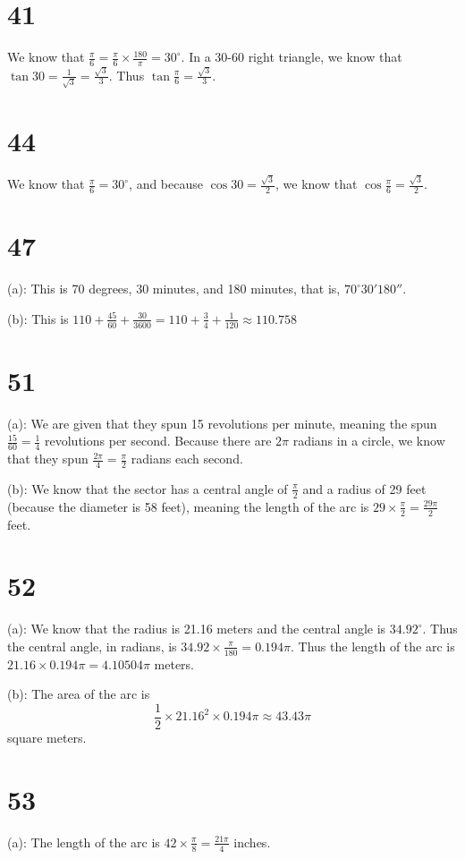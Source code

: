 \documentclass{article}
\theoremstyle{definition}
\newcommand{\?}{\stackrel{?}{=}}
\begin{document}
\section*{41}
We know that $\frac{\pi}{6}=\frac{\pi}{6}\times\frac{180}{\pi}=30^\circ$. In a 30-60 right triangle, we know that
$\tan 30=\frac{1}{\sqrt{3}}=\frac{\sqrt{3}}{3}$. Thus $\tan\frac{\pi}{6}=\frac{\sqrt{3}}{3}$.

\section*{44}
We know that $\frac{\pi}{6}=30^\circ$, and because 
$\cos 30=\frac{\sqrt{3}}{2}$, we know that $\cos\frac{\pi}{6}=\frac{\sqrt{3}}{2}$.

\section*{47}
(a): This is 70 degrees, 30 minutes, and 180 minutes, that is, $70^\circ 30'180''$.


(b): This is $110+\frac{45}{60}+\frac{30}{3600}=110+\frac{3}{4}+\frac{1}{120}\approx 110.758$

\section*{51}
(a): We are given that they spun 15 revolutions per minute, meaning the spun $\frac{15}{60}=\frac{1}{4}$ revolutions per second. Because there are $2\pi$ radians in a circle, we know that 
they spun $\frac{2\pi}{4}=\frac{\pi}{2}$ radians each second.


(b): We know that the sector has a central angle of $\frac{\pi}{2}$ and a radius of 29 feet (because the diameter is 58 feet), meaning the length of the arc is $29\times\frac{\pi}{2}=\frac{29\pi}{2}$ feet.

\section*{52}
(a): We know that the radius is 21.16 meters and the central angle is $34.92^\circ$. Thus the central angle, in radians, is
$34.92\times\frac{\pi}{180}=0.194\pi$. Thus the length of the arc is $21.16\times 0.194\pi=4.10504\pi$ meters.


(b): The area of the arc is \[ \frac{1}{2}\times 21.16^2\times 0.194\pi\approx 43.43\pi \] square meters.

\section*{53}
(a): The length of the arc is $42\times\frac{\pi}{8}=\frac{21\pi}{4}$ inches.
\end{document}
